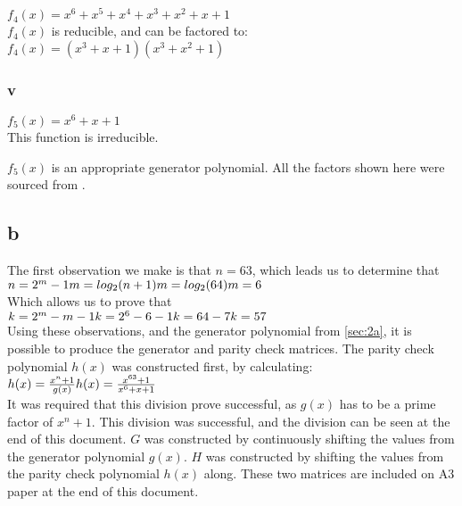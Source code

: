 $f_{4}(x) = x^{6} + x^{5} + x^{4} + x^{3} + x^{2} + x + 1$ \\

\noindent $f_{4}(x)$ is reducible, and can be factored to: \\

\noindent $f_{4}(x) = (x^{3} + x + 1)(x^{3} + x^{2} + 1)$

\subsubsection{v}

$f_{5}(x) = x^{6} + x + 1$ \\

\noindent This function is irreducible.

$f_{5}(x)$ is an appropriate generator polynomial.
All the factors shown here were sourced from \cite{website:Polynomials}.

\subsection{b}
The first observation we make is that $n = 63$, which leads us to determine that \\ $ n = 2^{m}-1 \\ m = log_{2}(n+1) \\ m = log_{2}(64) \\ m = 6$ \\
Which allows us to prove that \\ $k = 2^{m} - m - 1 \\ k = 2^{6} - 6 - 1 \\ k = 64 - 7 \\ k = 57$ \\
Using these observations, and the generator polynomial from \ref{sec:2a}, it is possible to produce the generator and parity check matrices.
The parity check polynomial $h(x)$ was constructed first, by calculating: \\
$h(x) = \frac{x^{n} + 1}{g(x)} \\ 
h(x) = \frac{x^{63} + 1}{x^{6} + x + 1}$\\

It was required that this division prove successful, as $g(x)$ has to be a prime factor of $x^{n} + 1$.
This division was successful, and the division can be seen at the end of this document.
$G$ was constructed by continuously shifting the values from the generator polynomial $g(x)$.
$H$ was constructed by shifting the values from the parity check polynomial $h(x)$ along.
These two matrices are included on A3 paper at the end of this document.

